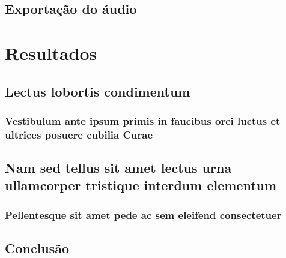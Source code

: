 \documentclass[
	12pt,				%
	openright,			%
	twoside,			%
	a4paper,			%
	english,			%
	french,				%
	spanish,			%
	brazil				%
	]{abntex2}
\begin{document}
\chapter{Exportação do áudio}



\part{Resultados}

\chapter{Lectus lobortis condimentum}

\section{Vestibulum ante ipsum primis in faucibus orci luctus et ultrices
posuere cubilia Curae}

\lipsum[21-22]

\chapter{Nam sed tellus sit amet lectus urna ullamcorper tristique interdum
elementum}

\section{Pellentesque sit amet pede ac sem eleifend consectetuer}

\lipsum[24]


\chapter{Conclusão}

\lipsum[31-33]
\end{document}

